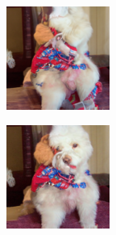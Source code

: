 \documentclass{article}
\begin{document}
\begin{figure}
\begin{subfigure}[b]{0.5\linewidth}
\begin{subfigure}[b]{0.242\linewidth}
        \end{subfigure}%
        \begin{subfigure}[b]{0.242\linewidth}
        \includegraphics[width=\linewidth]{figures/imagenet128/solver_samples/imagenet128_fm_ot_159_20.png}
        \end{subfigure}%
        \begin{subfigure}[b]{0.242\linewidth}
        \includegraphics[width=\linewidth]{figures/imagenet128/solver_samples/imagenet128_fm_ot_159_50.png}

\end{subfigure}
\end{subfigure}
\end{figure}
\end{document}
